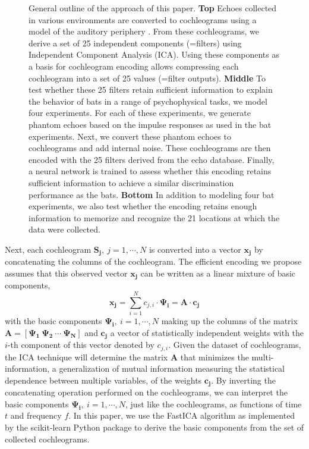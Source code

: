 \documentclass[10pt,letterpaper]{article}
\begin{document}
\begin{figure}[ht]
	\centering
	\caption{General outline of the approach of this paper. \textbf{Top} Echoes collected in various environments are converted to cochleograms using a model of the auditory periphery \cite{Wiegrebe2008}. From these cochleograms, we derive a set of 25 independent components (=filters) using Independent Component Analysis (ICA). Using these components as a basis for cochleogram encoding allows compressing each cochleogram into a set of 25 values (=filter outputs). \textbf{Middle} To test whether these 25 filters retain sufficient information to explain the behavior of bats in a range of psychophysical tasks, we model four experiments. For each of these experiments, we generate phantom echoes based on the impulse responses as used in the bat experiments. Next, we convert these phantom echoes to cochleograms and add internal noise. These cochleograms are then encoded with the 25 filters derived from the echo database. Finally, a neural network is trained to assess whether this encoding retains sufficient information to achieve a similar discrimination performance as the bats. \textbf{Bottom} In addition to modeling four bat experiments, we also test whether the encoding retains enough information to memorize and recognize the 21 locations at which the data were collected.}
	\label{fig:processing}
\end{figure}

Next, each cochleogram $\mathbf{S_j},\ j=1, \cdots, N$ is converted into a vector $\mathbf{x_j}$ by concatenating the columns of the cochleogram. The efficient encoding we propose assumes that this observed vector $\mathbf{x_j}$ can be written as a linear mixture of basic components,
%
\begin{equation}
\mathbf{x_j} = \sum _{i=1}^{N} c_{j,i} \cdot \mathbf{\Psi_i}= \mathbf{A} \cdot \mathbf{c_j} 
\label{eq:filter}
\end{equation} 
%
with the basic components $\mathbf{\Psi_i},\ i=1, \cdots, N$ making up the columns of the matrix $\mathbf{A}=\left[\mathbf{\Psi_1} \ \mathbf{\Psi_2} \ \cdots \ \mathbf{\Psi_N} \right]$ 
%
and 
%
$\mathbf{c_j}$ a vector of statistically independent weights with the $i$-th component of this vector denoted by $c_{j,i}$. Given the dataset of cochleograms, the ICA technique will determine the matrix $\mathbf{A}$ that minimizes the multi-information, a generalization of mutual information measuring the statistical dependence between multiple variables, of the weights $\mathbf{c_j}$. By inverting the concatenating operation performed on the cochleograms, we can interpret the basic components $\mathbf{\Psi_i},\ i=1, \cdots, N$, just like the cochleograms, as functions of time $t$ and frequency $f$. In this paper, we use the FastICA \cite{Hyvarinen2000} algorithm as implemented by the scikit-learn Python package \cite{scikit-learn} to derive the basic components from the set of collected cochleograms. 
\end{document}
